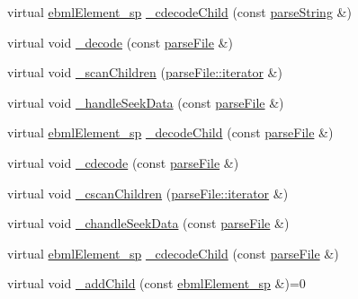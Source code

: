 \begin{DoxyCompactItemize}
\item 
virtual \mbox{\hyperlink{namespaceebml_adad533b7705a16bb360fe56380c5e7be}{ebml\+Element\+\_\+sp}} \mbox{\hyperlink{classebml_1_1ebmlMasterElement_a5343fa61c506f60649f433a6b92f8f56}{\+\_\+cdecode\+Child}} (const \mbox{\hyperlink{classebml_1_1parseString}{parse\+String}} \&)
\item 
virtual void \mbox{\hyperlink{classebml_1_1ebmlMasterElement_a0c96ec791e04e776c8f7ae969e164855}{\+\_\+decode}} (const \mbox{\hyperlink{classebml_1_1parseFile}{parse\+File}} \&)
\item 
virtual void \mbox{\hyperlink{classebml_1_1ebmlMasterElement_a233be2f503f44d36608b16db5a2c3394}{\+\_\+scan\+Children}} (\mbox{\hyperlink{classebml_1_1parseFile_1_1iterator}{parse\+File\+::iterator}} \&)
\item 
virtual void \mbox{\hyperlink{classebml_1_1ebmlMasterElement_a70a38217f7aab170e2e2f062d3c9a777}{\+\_\+handle\+Seek\+Data}} (const \mbox{\hyperlink{classebml_1_1parseFile}{parse\+File}} \&)
\item 
virtual \mbox{\hyperlink{namespaceebml_adad533b7705a16bb360fe56380c5e7be}{ebml\+Element\+\_\+sp}} \mbox{\hyperlink{classebml_1_1ebmlMasterElement_a52c0643e9712686018ac3f3d305cff16}{\+\_\+decode\+Child}} (const \mbox{\hyperlink{classebml_1_1parseFile}{parse\+File}} \&)
\item 
virtual void \mbox{\hyperlink{classebml_1_1ebmlMasterElement_a4cc06e13186cec1fb00fca66b4a1f265}{\+\_\+cdecode}} (const \mbox{\hyperlink{classebml_1_1parseFile}{parse\+File}} \&)
\item 
virtual void \mbox{\hyperlink{classebml_1_1ebmlMasterElement_a5c076b30207aefe6f6ecc46de3b96379}{\+\_\+cscan\+Children}} (\mbox{\hyperlink{classebml_1_1parseFile_1_1iterator}{parse\+File\+::iterator}} \&)
\item 
virtual void \mbox{\hyperlink{classebml_1_1ebmlMasterElement_abc2e3886fd267121fdd750dc98f18480}{\+\_\+chandle\+Seek\+Data}} (const \mbox{\hyperlink{classebml_1_1parseFile}{parse\+File}} \&)
\item 
virtual \mbox{\hyperlink{namespaceebml_adad533b7705a16bb360fe56380c5e7be}{ebml\+Element\+\_\+sp}} \mbox{\hyperlink{classebml_1_1ebmlMasterElement_a5dca0f871f0c413936be8167a48a3275}{\+\_\+cdecode\+Child}} (const \mbox{\hyperlink{classebml_1_1parseFile}{parse\+File}} \&)
\item 
virtual void \mbox{\hyperlink{classebml_1_1ebmlMasterElement_a59c5f3b3409fd5fd6f0f22c7a68f1c9b}{\+\_\+add\+Child}} (const \mbox{\hyperlink{namespaceebml_adad533b7705a16bb360fe56380c5e7be}{ebml\+Element\+\_\+sp}} \&)=0

\end{DoxyCompactItemize}
